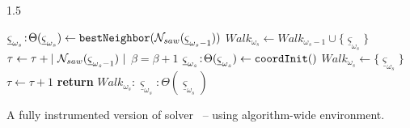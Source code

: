 \begin{algorithm-wide}[h]{1.5\textwidth}
\begin{footnotesize}
\begin{minipage}[!T]{0.49\linewidth}
\begin{algorithmic}[1]
        \STATE ${\underline \varsigma}_{\omega_{s}}\!:\!\Theta({\underline \varsigma}_{\omega_{s}}) \gets {\tt bestNeighbor}({\cal N}_{saw} ({\underline \varsigma}_{\omega_{s} -1}))$
        \STATE $Walk_{\omega_{s}} \gets Walk_{\omega_{s}-1} \cup \{{\underline \varsigma}_{\omega_{s}}\}$
        \STATE $\tau \gets \tau + |~{\cal N}_{saw} ({\underline \varsigma}_{\omega_{s} -1})~| $ 
        \STATE $\beta = \beta + 1$ 
        \STATE ${\underline \varsigma}_{\omega_{s}}\!:\!\Theta({\underline \varsigma}_{\omega_{s}}) \gets {\tt coordInit}()$ 
        \STATE $Walk_{\omega_{s}} \gets \{ {\underline \varsigma}_{\omega_{s}} \}$
        \STATE $\tau \gets \tau + 1 $ 
    \ENDIF
\STATE \textbf{return} $Walk_{\omega_{s}}\!:\!{\underline \varsigma}_{\omega_{s}}\!:\!\Theta({\underline \varsigma}_{\omega_{s}})$ 
\ENDPROCEDURE 
\end{algorithmic}
\end{minipage}
\caption[Algorithm file: alg-global-search2-wide.tex]{A fully instrumented version of solver \lssOrel\ -- using algorithm-wide environment.} 
\label{alg-global-search2-wide}
\end{footnotesize}
\end{algorithm-wide}